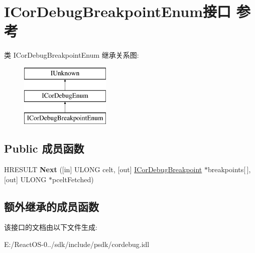 \hypertarget{interface_i_cor_debug_breakpoint_enum}{}\section{I\+Cor\+Debug\+Breakpoint\+Enum接口 参考}
\label{interface_i_cor_debug_breakpoint_enum}
类 I\+Cor\+Debug\+Breakpoint\+Enum 继承关系图\+:\begin{figure}[H]
\begin{center}
\leavevmode
\includegraphics[height=3.000000cm]{interface_i_cor_debug_breakpoint_enum}
\end{center}
\end{figure}
\subsection*{Public 成员函数}
\begin{DoxyCompactItemize}
\item 
\mbox{\label{interface_i_cor_debug_breakpoint_enum_ac441ff1d27c651924df647578f6ea016}} 
H\+R\+E\+S\+U\+LT {\bfseries Next} (\mbox{[}in\mbox{]} U\+L\+O\+NG celt, \mbox{[}out\mbox{]} \hyperlink{interface_i_cor_debug_breakpoint}{I\+Cor\+Debug\+Breakpoint} $\ast$breakpoints\mbox{[}$\,$\mbox{]}, \mbox{[}out\mbox{]} U\+L\+O\+NG $\ast$pcelt\+Fetched)
\end{DoxyCompactItemize}
\subsection*{额外继承的成员函数}


该接口的文档由以下文件生成\+:\begin{DoxyCompactItemize}
\item 
E\+:/\+React\+O\+S-\/0../sdk/include/psdk/cordebug.\+idl\end{DoxyCompactItemize}
